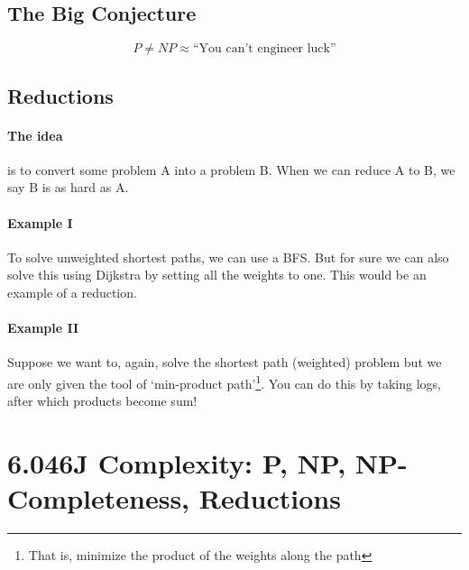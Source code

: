 \documentclass[10pt]{article}
\begin{document}
\subsection{The Big Conjecture}
\begin{equation*}
    P\neq NP \approx \text{``You can't engineer luck''}
\end{equation*}

\subsection{Reductions}
\paragraph{The idea} is to convert some problem A into a problem B. When we can reduce A to B, we say B is as hard as A. 
\paragraph{Example I} To solve unweighted shortest paths, we can use a BFS. But for sure we can also solve this using Dijkstra by setting all the weights to one. This would be an example of a reduction. 
\paragraph{Example II} Suppose we want to, again, solve the shortest path (weighted) problem but we are only given the tool of `min-product path'\footnote{That is, minimize the product of the weights along the path}. You can do this by taking logs, after which products become sum!

\section{6.046J Complexity: P, NP, NP-Completeness, Reductions}
\end{document}
